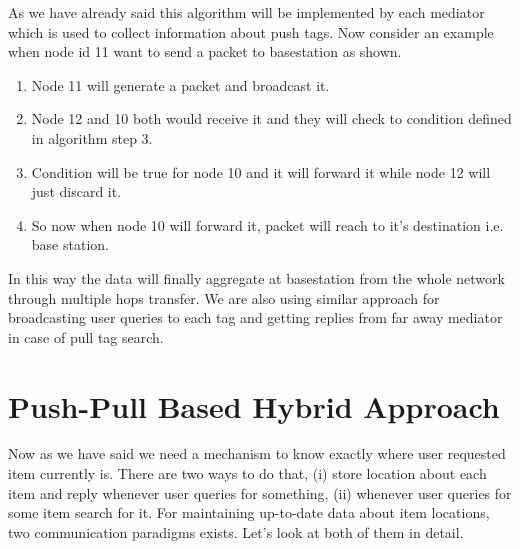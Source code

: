 \documentclass [a4paper,12pt]{book}
\begin{document}
As we have already said this algorithm will be implemented by each mediator which is used to collect information about push tags. Now consider an example when node id 11 want to send a packet to basestation as shown.
\begin{enumerate}
\item Node 11 will generate a packet and broadcast it.
\item Node 12 and 10 both would receive it and they will check to condition defined in algorithm step 3.
\item Condition will be true for node 10 and it will forward it while node 12 will just discard it.
\item So now when node 10 will forward it, packet will reach to it's destination i.e. base station.
\end{enumerate}
In this way the data will finally aggregate at basestation from the whole network through multiple hops transfer. We are also using similar approach for broadcasting user queries to each tag and getting replies from far away mediator in case of pull tag search.

\section{Push-Pull Based Hybrid Approach}

Now as we have said we need a mechanism to know exactly where user requested item currently is. There are two ways to do that, (i) store location about each item and reply whenever user queries for something, (ii) whenever user queries for some item search for it. For maintaining up-to-date data about item locations, two communication paradigms exists. Let's look at both of them in detail.
\end{document}
